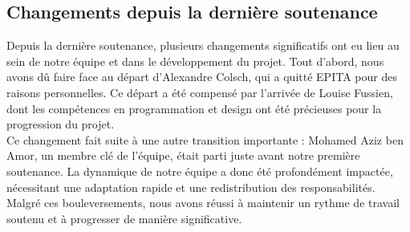 \subsection{Changements depuis la dernière soutenance}

Depuis la dernière soutenance, plusieurs changements significatifs ont eu lieu au sein de notre équipe et dans le développement du projet. 
Tout d'abord, nous avons dû faire face au départ d'Alexandre Colsch, qui a quitté EPITA  pour des raisons personnelles. 
Ce départ a été compensé par l'arrivée de Louise Fussien, dont les compétences en programmation et design ont été précieuses pour la progression du projet.
\\

Ce changement fait suite à une autre transition importante : Mohamed Aziz ben Amor, un membre clé de l'équipe, était parti juste avant notre première soutenance. 
La dynamique de notre équipe a donc été profondément impactée, nécessitant une adaptation rapide et une redistribution des responsabilités.
\\

Malgré ces bouleversements, nous avons réussi à maintenir un rythme de travail soutenu et à progresser de manière significative.
\\
